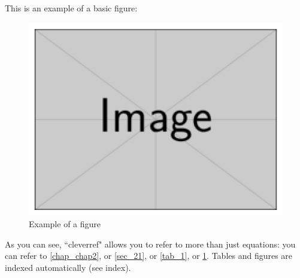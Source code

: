 This is an example of a basic figure:
\begin{figure}[htb]
  \centering
  \includegraphics[scale=0.3]{images/fig1}
  \caption{Example of a figure} \label{fig_1}
\end{figure}
As you can see, ``cleverref" allows you to refer to more than just equations: you can refer to \cref{chap_chap2}, or \cref{sec_21}, or \cref{tab_1}, or \cref{fig_1}.
Tables and figures are indexed automatically (see index).

